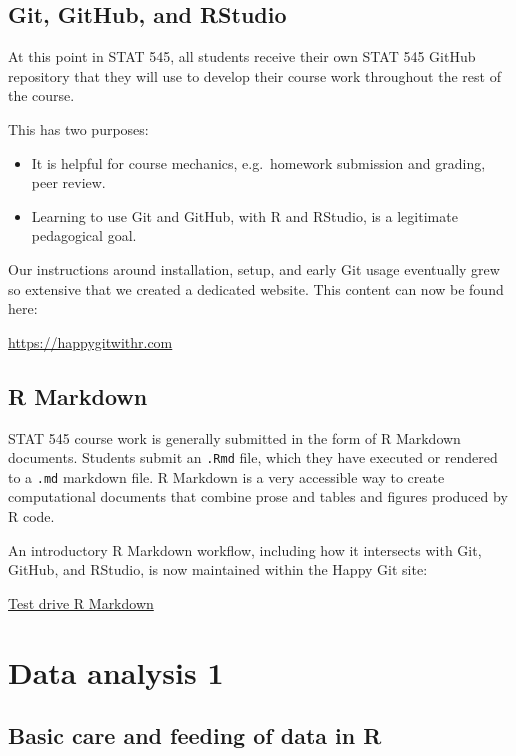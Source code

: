 \documentclass[
]{book}
\providecommand{\tightlist}{%
  \setlength{\itemsep}{0pt}\setlength{\parskip}{0pt}}
\begin{document}
\hypertarget{version-control}{%
\chapter{Git, GitHub, and RStudio}\label{version-control}}

At this point in STAT 545, all students receive their own STAT 545 GitHub repository that they will use to develop their course work throughout the rest of the course.

This has two purposes:

\begin{itemize}
\tightlist
\item
  It is helpful for course mechanics, e.g.~homework submission and grading,
  peer review.
\item
  Learning to use Git and GitHub, with R and RStudio, is a legitimate
  pedagogical goal.
\end{itemize}

Our instructions around installation, setup, and early Git usage eventually grew so extensive that we created a dedicated website. This content can now be found here:

\url{https://happygitwithr.com}

\hypertarget{r-markdown}{%
\chapter{R Markdown}\label{r-markdown}}

STAT 545 course work is generally submitted in the form of R Markdown documents. Students submit an \texttt{.Rmd} file, which they have executed or rendered to a \texttt{.md} markdown file. R Markdown is a very accessible way to create computational documents that combine prose and tables and figures produced by R code.

An introductory R Markdown workflow, including how it intersects with Git, GitHub, and RStudio, is now maintained within the Happy Git site:

\href{https://happygitwithr.com/rmd-test-drive.html}{Test drive R Markdown}

\hypertarget{part-data-analysis-1}{%
\part{Data analysis 1}\label{part-data-analysis-1}}

\hypertarget{basic-data-care}{%
\chapter{Basic care and feeding of data in R}\label{basic-data-care}}
\end{document}
